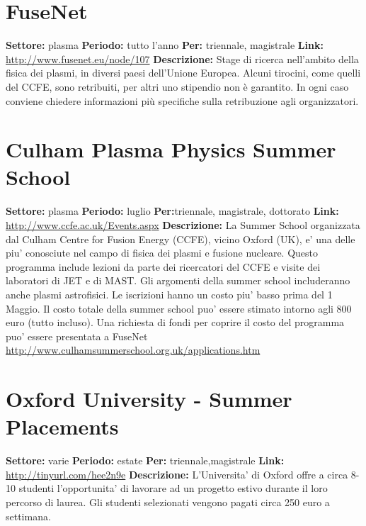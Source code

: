 \documentclass[a4paper,10pt]{article}
\begin{document}
\section{FuseNet}
\textbf{Settore:} plasma\newline
\textbf{Periodo:} tutto l'anno\newline
\textbf{Per:} triennale, magistrale\newline
\textbf{Link:} \url{http://www.fusenet.eu/node/107} \newline
\textbf{Descrizione:} Stage di ricerca nell’ambito della fisica dei plasmi, in diversi paesi dell’Unione Europea. Alcuni tirocini, come quelli del CCFE, sono retribuiti, per altri uno stipendio non è garantito. In ogni caso conviene chiedere informazioni più specifiche sulla retribuzione agli organizzatori.  

\section{Culham Plasma Physics Summer School}
\textbf{Settore:} plasma \newline
\textbf{Periodo:} luglio\newline
\textbf{Per:}triennale, magistrale, dottorato\newline
\textbf{Link:} \url{http://www.ccfe.ac.uk/Events.aspx} \newline
\textbf{Descrizione:}   La Summer School organizzata dal Culham Centre for Fusion Energy (CCFE), vicino Oxford (UK), e' una delle piu' conosciute nel campo di fisica dei plasmi e fusione nucleare. Questo programma include lezioni da parte dei ricercatori del CCFE e visite dei laboratori di JET e di MAST. Gli argomenti della summer school includeranno anche plasmi astrofisici. Le iscrizioni hanno un costo piu' basso prima del 1 Maggio. Il costo totale della summer school puo' essere stimato intorno agli 800 euro (tutto incluso). Una richiesta di fondi per coprire il costo del programma puo' essere presentata a FuseNet \url{http://www.culhamsummerschool.org.uk/applications.htm}  

\section{Oxford University - Summer Placements}
\textbf{Settore:} varie \newline
\textbf{Periodo:} estate \newline
\textbf{Per:} triennale,magistrale\newline
\textbf{Link:} \url{http://tinyurl.com/hee2n9e} \newline
\textbf{Descrizione:} L'Universita' di Oxford offre a circa 8-10 studenti l'opportunita' di lavorare ad un progetto estivo durante il loro percorso di laurea. Gli studenti selezionati vengono pagati circa 250 euro a settimana.  
\end{document}
